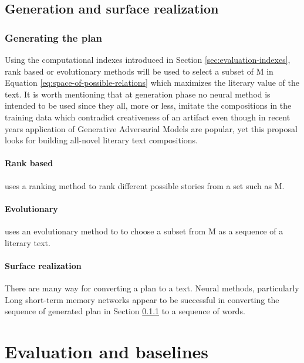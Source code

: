 \documentclass{article}
\begin{document}
			
			
			
		
		\subsection{Generation and surface realization}
			\subsubsection{Generating the plan}\label{sec:plan-generation}
				Using the computational indexes introduced in Section \ref{sec:evaluation-indexes}, rank based or evolutionary methods will be used to select a subset of M in Equation \ref{eq:space-of-possible-relations} which maximizes the literary value of the text. It is worth mentioning that at generation phase no neural method is intended to be used since they all, more or less, imitate the compositions in the training data which contradict creativeness of an artifact even though in recent years application of Generative Adversarial Models are popular, yet this proposal looks for building all-novel literary text compositions. 
				\paragraph{Rank based}
					\citet{mcintyre-2009-learning-to-tell-tales-a-data-driven-approach-to-story-generation} uses a ranking method to rank different possible stories from a set such as M. 
				\paragraph{Evolutionary}
					\citet{mcintyre-2010-plot-induction-and-evolutionary-search-for-story-generation} uses an evolutionary method to to choose a subset from M as a sequence of a literary text. 
			\paragraph{Surface realization} There are many way for converting a plan to a text. Neural methods, particularly Long short-term memory networks \cite{hochreiter-1997-long-short-term-memory,sutskever-2014-sequence-to-sequence-learning-with-neural-networks} appear to be successful in converting the sequence of generated plan in Section \ref{sec:plan-generation} to a sequence of words. 
			
	\section{Evaluation and baselines}
\end{document}
